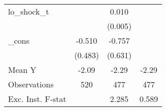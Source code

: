 {\begin{tabular}{l*{3}{c}}
\addlinespace
lo\_shock\_t  &                     &       0.010\sym{*}  &                     \\
            &                     &     (0.005)         &                     \\
\addlinespace
\_cons      &      -0.510         &      -0.757         &                     \\
            &     (0.483)         &     (0.631)         &                     \\
\midrule
Mean Y      &       -2.09         &       -2.29         &       -2.29         \\
Observations&         520         &         477         &         477         \\
Exc. Inst. F-stat&                     &       2.285         &       0.589         \\
\bottomrule
\end{tabular}
}
